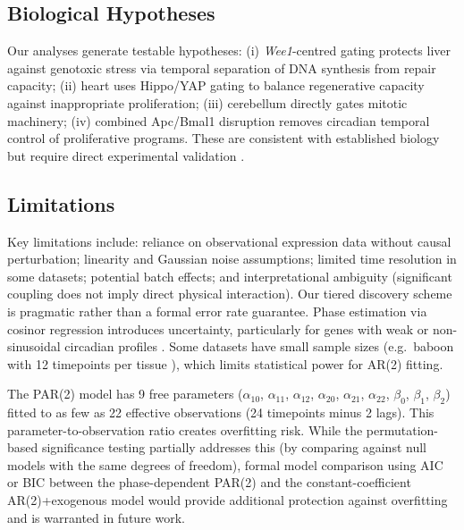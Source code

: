 \documentclass[11pt,letterpaper]{article}
\begin{document}
\subsection{Biological Hypotheses}

Our analyses generate testable hypotheses: (i) \textit{Wee1}-centred gating protects liver against genotoxic stress via temporal separation of DNA synthesis from repair capacity; (ii) heart uses Hippo/YAP gating to balance regenerative capacity against inappropriate proliferation; (iii) cerebellum directly gates mitotic machinery; (iv) combined Apc/Bmal1 disruption removes circadian temporal control of proliferative programs. These are consistent with established biology but require direct experimental validation \citep{matsuo2003control, sancar2021clocks, weisel2015targeting, ouyang2024circadian}.

\subsection{Limitations}

Key limitations include: reliance on observational expression data without causal perturbation; linearity and Gaussian noise assumptions; limited time resolution in some datasets; potential batch effects; and interpretational ambiguity (significant coupling does not imply direct physical interaction). Our tiered discovery scheme is pragmatic rather than a formal error rate guarantee. Phase estimation via cosinor regression introduces uncertainty, particularly for genes with weak or non-sinusoidal circadian profiles \citep{cornelissen2014cosinor}. Some datasets have small sample sizes (e.g.\ baboon with 12 timepoints per tissue \citep{mure2018diurnal}), which limits statistical power for AR(2) fitting.

The PAR(2) model has 9 free parameters ($\alpha_{10}$, $\alpha_{11}$, $\alpha_{12}$, $\alpha_{20}$, $\alpha_{21}$, $\alpha_{22}$, $\beta_0$, $\beta_1$, $\beta_2$) fitted to as few as 22 effective observations (24 timepoints minus 2 lags). This parameter-to-observation ratio creates overfitting risk. While the permutation-based significance testing partially addresses this (by comparing against null models with the same degrees of freedom), formal model comparison using AIC or BIC between the phase-dependent PAR(2) and the constant-coefficient AR(2)+exogenous model would provide additional protection against overfitting and is warranted in future work.
\end{document}
